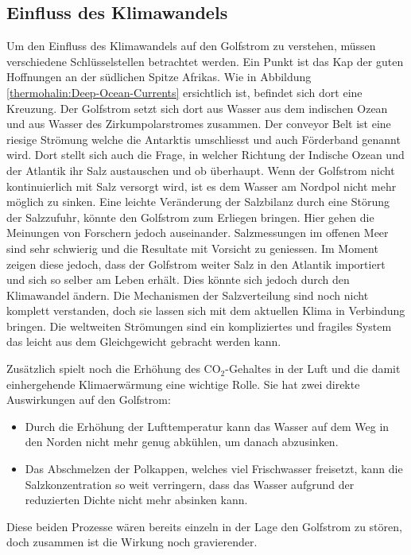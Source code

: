 \subsection{Einfluss des Klimawandels}\label{thermohalin:EinflussKlimawandel}

Um den Einfluss des Klimawandels auf den Golfstrom zu verstehen, müssen verschiedene Schlüsselstellen betrachtet werden.
Ein Punkt ist das Kap der guten Hoffnungen an der südlichen Spitze Afrikas.
Wie in Abbildung \ref{thermohalin:Deep-Ocean-Currents} ersichtlich ist, befindet sich dort eine Kreuzung.
Der Golfstrom setzt sich dort aus Wasser aus dem indischen Ozean und aus Wasser des Zirkumpolarstromes zusammen. Der conveyor Belt ist eine riesige Strömung welche die Antarktis umschliesst und auch Förderband genannt wird.
%
Dort stellt sich auch die Frage, in welcher Richtung der Indische Ozean und der Atlantik ihr Salz austauschen und ob überhaupt. Wenn der Golfstrom nicht kontinuierlich mit Salz versorgt wird, ist es dem Wasser am Nordpol nicht mehr möglich zu sinken. Eine leichte Veränderung der Salzbilanz durch eine Störung der Salzzufuhr, könnte den Golfstrom zum Erliegen bringen. Hier gehen die Meinungen von Forschern jedoch auseinander. Salzmessungen im offenen Meer sind sehr schwierig und die Resultate mit Vorsicht zu geniessen.
Im Moment zeigen diese jedoch, dass der Golfstrom weiter Salz in den Atlantik importiert und sich so selber am Leben erhält. Dies könnte sich jedoch durch den Klimawandel ändern. Die Mechanismen der Salzverteilung sind noch nicht komplett verstanden, doch sie lassen sich mit dem aktuellen Klima in Verbindung bringen. Die weltweiten Strömungen sind ein kompliziertes und fragiles System das leicht aus dem Gleichgewicht gebracht werden kann. 

Zusätzlich spielt noch die Erhöhung des $\text{CO}_2$-Gehaltes in der Luft und die damit einhergehende Klimaerwärmung eine wichtige Rolle. Sie hat zwei direkte Auswirkungen auf den Golfstrom:

\begin{itemize}
	\item Durch die Erhöhung der Lufttemperatur kann das Wasser auf dem Weg in den Norden nicht mehr genug abkühlen, um danach abzusinken.
	\item Das Abschmelzen der Polkappen, welches viel Frischwasser freisetzt, kann die Salzkonzentration so weit verringern, dass das Wasser aufgrund der reduzierten Dichte nicht mehr absinken kann.
\end{itemize}
Diese beiden Prozesse wären bereits einzeln in der Lage den Golfstrom zu stören, doch zusammen ist die Wirkung noch gravierender.


